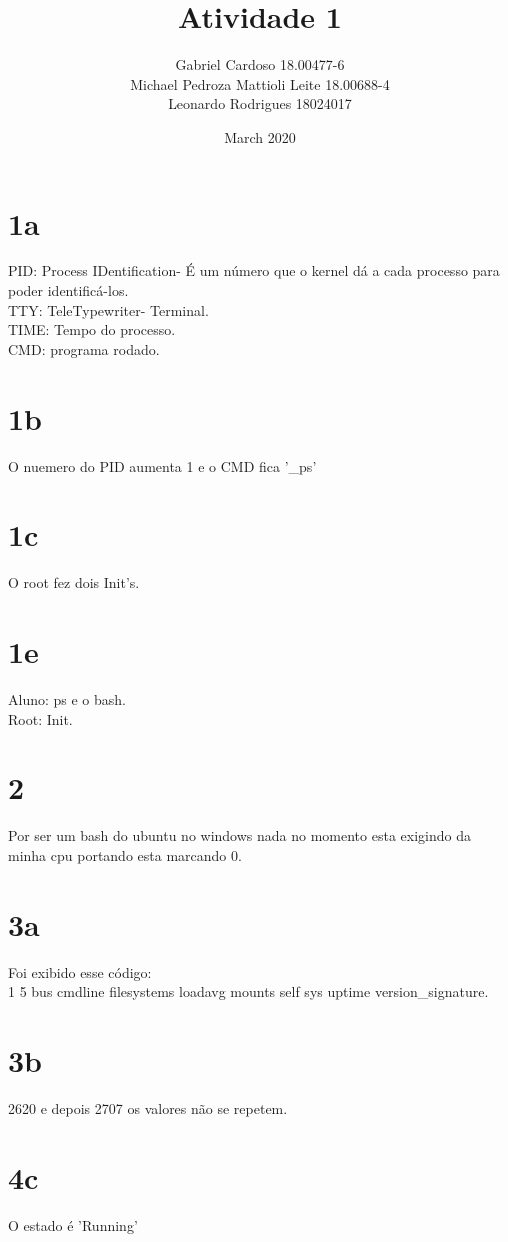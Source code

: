 \documentclass{article}
\title{Atividade 1}
\author{Gabriel Cardoso 18.00477-6 \\ Michael Pedroza Mattioli Leite 18.00688-4 \\ Leonardo Rodrigues 18024017 }
\date{March 2020}
\begin{document}
\maketitle
\section*{1a}
PID: Process IDentification- É um número que o kernel dá a cada processo para poder identificá-los.\\
TTY: TeleTypewriter- Terminal.\\
TIME: Tempo do processo.\\
CMD: programa rodado.\\
\section*{1b}
O nuemero do PID aumenta 1 e o CMD fica '\_ps'\\
\section*{1c}
O root fez dois Init's.\\
\section*{1e}
Aluno: ps e o bash.\\
Root: Init.\\
\section*{2}
Por ser um bash do ubuntu no windows nada no momento esta exigindo da minha cpu portando esta marcando 0.\\
\section*{3a}
Foi exibido esse código:\\
1 5 bus   cmdline  filesystems  loadavg  mounts  self  sys  uptime   version_signature.\\

\section*{3b}

2620 e depois 2707 os valores não se repetem.\\
\section*{4c}
O estado é 'Running'
\end{document}
